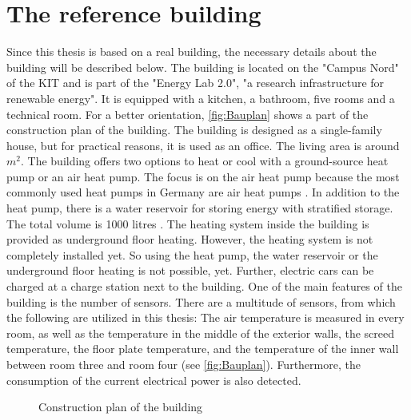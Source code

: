 \section{The reference building}
\label{section:building}
    Since this thesis is based on a real building, the necessary details about the building will be described below.
    The building is located on the "Campus Nord" of the KIT and is part of the "Energy Lab 2.0", "a research infrastructure for renewable energy"\cite{KIT.2021}. It is equipped with a kitchen, a bathroom, five rooms and a technical room. For a better orientation, \autoref{fig:Bauplan} shows a part of the construction plan of the building. The building is designed as a single-family house, but for practical reasons, it is used as an office. The living area is around $m^2$. The building offers two options to heat or cool with a ground-source heat pump or an air heat pump. The focus is on the air heat pump because the most commonly used heat pumps in Germany are air heat pumps \cite{bwp.2021}. In addition to the heat pump, there is a water reservoir for storing energy with stratified storage. The total volume is 1000 litres \cite{Oskar}. The heating system inside the building is provided as underground floor heating. However, the heating system is not completely installed yet. So using the heat pump, the water reservoir or the underground floor heating is not possible, yet. Further, electric cars can be charged at a charge station next to the building.
    \newline
    One of the main features of the building is the number of sensors. There are a multitude of sensors, from which the following are utilized in this thesis: The air temperature is measured in every room, as well as the temperature in the middle of the exterior walls, the screed temperature, the floor plate temperature, and the temperature of the inner wall between room three and room four (see \autoref{fig:Bauplan}). Furthermore, the consumption of the current electrical power is also detected. 
    
    \begin{figure}
        \centering
        \def\svgwidth{360pt}
        
        \caption{Construction plan of the building \cite{Bauplan}}
        \label{fig:Bauplan}
    \end{figure}